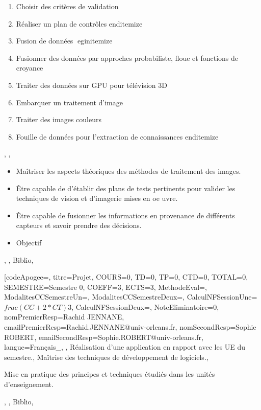 {\begin{enumerate}
 \item  Choisir des critères de validation
 \item  Réaliser un plan de contrôles
 end{itemize}
\item  Fusion de données
 egin{itemize}
 \item  Fusionner des données par approches probabiliste, floue et fonctions de croyance
 \item  Traiter des données sur GPU pour télévision 3D
 \item  Embarquer un traitement d'image 
 \item  Traiter des images couleurs
 \item  Fouille de données pour l'extraction de connaissances
 end{itemize}
\end{enumerate}},
{},
{\begin{itemize}
\item Maîtriser les aspects théoriques des méthodes de traitement des images.
\item Être capable de d'établir des plans de tests pertinents pour valider les techniques de vision et d'imagerie mises en oe uvre.
\item Être capable de fusionner les informations en provenance de différents capteurs et savoir prendre des décisions.
\item Objectif
\end{itemize}},
{},
{Biblio},

\vfill


\module[codeApogee={},
titre={Projet},
COURS={0},
TD={0},
TP={0},
CTD={0},
TOTAL={0},
SEMESTRE={Semestre 0},
COEFF={3},
ECTS={3},
MethodeEval={},
ModalitesCCSemestreUn={},
ModalitesCCSemestreDeux={},
CalculNFSessionUne={$frac{(CC+2*CT)}{3}$},
CalculNFSessionDeux={},
NoteEliminatoire={0},
nomPremierResp={Rachid JENNANE},
emailPremierResp={Rachid.JENNANE@univ-orleans.fr},
nomSecondResp={Sophie ROBERT},
emailSecondResp={Sophie.ROBERT@univ-orleans.fr},
langue={Français_},
{},
{Réalisation d'une application en rapport avec les UE du semestre.},
{Maîtrise des techniques de développement de logiciels.},
{\begin{itemize}
\ObjItem Mise en pratique des principes et techniques étudiés dans les unités d'enseignement.
\end{itemize}},
{},
{Biblio},

\vfill


